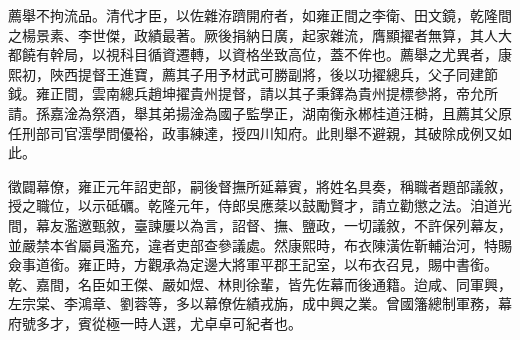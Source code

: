 \begin{pinyinscope}
薦舉不拘流品。清代才臣，以佐雜洊躋開府者，如雍正間之李衛、田文鏡，乾隆間之楊景素、李世傑，政績最著。厥後捐納日廣，起家雜流，膺顯擢者無算，其人大都饒有幹局，以視科目循資遷轉，以資格坐致高位，蓋不侔也。薦舉之尤異者，康熙初，陜西提督王進寶，薦其子用予材武可勝副將，後以功擢總兵，父子同建節鉞。雍正間，雲南總兵趙坤擢貴州提督，請以其子秉鐸為貴州提標參將，帝允所請。孫嘉淦為祭酒，舉其弟揚淦為國子監學正，湖南衡永郴桂道汪榯，且薦其父原任刑部司官澐學問優裕，政事練達，授四川知府。此則舉不避親，其破除成例又如此。

徵闢幕僚，雍正元年詔吏部，嗣後督撫所延幕賓，將姓名具奏，稱職者題部議敘，授之職位，以示砥礪。乾隆元年，侍郎吳應棻以鼓勵賢才，請立勸懲之法。洎道光間，幕友濫邀甄敘，臺諫屢以為言，詔督、撫、鹽政，一切議敘，不許保列幕友，並嚴禁本省屬員濫充，違者吏部查參議處。然康熙時，布衣陳潢佐靳輔治河，特賜僉事道銜。雍正時，方觀承為定邊大將軍平郡王記室，以布衣召見，賜中書銜。乾、嘉間，名臣如王傑、嚴如煜、林則徐輩，皆先佐幕而後通籍。迨咸、同軍興，左宗棠、李鴻章、劉蓉等，多以幕僚佐績戎旃，成中興之業。曾國籓總制軍務，幕府號多才，賓從極一時人選，尤卓卓可紀者也。


\end{pinyinscope}